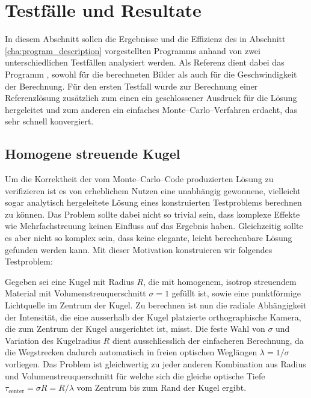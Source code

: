 	\chapter{Testfälle und Resultate}
	In diesem Abschnitt sollen die Ergebnisse und die Effizienz des in Abschnitt \ref{cha:program_description} vorgestellten Programms anhand von zwei unterschiedlichen Testfällen analysiert werden. Als Referenz dient dabei das Programm \mctd \citep{Wolf:2003p12974}, sowohl für die berechneten Bilder als auch für die Geschwindigkeit der Berechnung. Für den ersten Testfall wurde zur Berechnung einer Referenzlösung zusätzlich zum einen ein geschlossener Ausdruck für die Lösung hergeleitet und zum anderen ein einfaches Monte--Carlo--Verfahren erdacht, das sehr schnell konvergiert.
	
	\section{Homogene streuende Kugel}
	Um die Korrektheit der vom Monte--Carlo--Code produzierten Lösung zu verifizieren ist es von erheblichem Nutzen eine unabhängig gewonnene, vielleicht sogar analytisch hergeleitete Lösung eines konstruierten Testproblems berechnen zu können. Das Problem sollte dabei nicht so trivial sein, dass komplexe Effekte wie Mehrfachstreuung keinen Einfluss auf das Ergebnis haben. Gleichzeitig sollte es aber nicht so komplex sein, dass keine elegante, leicht berechenbare Lösung gefunden werden kann.
	Mit dieser Motivation konstruieren wir folgendes Testproblem:
		
	Gegeben sei eine Kugel mit Radius $R$, die mit homogenem, isotrop streuendem Material mit Volumenstreuquerschnitt $\sigma=1$ gefüllt ist, sowie eine punktförmige Lichtquelle im Zentrum der Kugel. Zu berechnen ist nun die radiale Abhängigkeit der Intensität, die eine ausserhalb der Kugel platzierte orthographische Kamera, die zum Zentrum der Kugel ausgerichtet ist, misst. Die feste Wahl von $\sigma$ und Variation des Kugelradius $R$ dient ausschliesslich der einfacheren Berechnung, da die Wegstrecken dadurch automatisch in freien optischen  Weglängen $\lambda=1/\sigma$ vorliegen. Das Problem ist gleichwertig zu jeder anderen Kombination aus Radius und Volumenstreuquerschnitt für welche sich die gleiche optische Tiefe $\tau_\text{center}=\sigma R=R/\lambda$ vom Zentrum bis zum Rand der Kugel ergibt.
	

